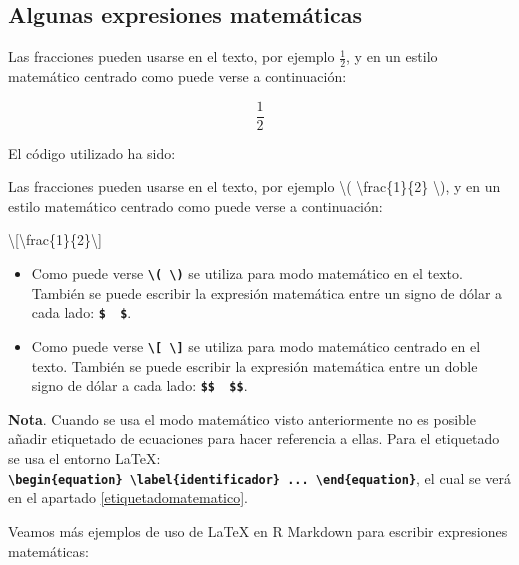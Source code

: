 \documentclass[12pt,a4paper,]{book}
\newenvironment{Shaded}{\begin{snugshade}}{\end{snugshade}}
\newcommand{\NormalTok}[1]{#1}
\newcommand{\SpecialCharTok}[1]{\textcolor[rgb]{0.00,0.00,0.00}{#1}}
\numberwithin{dummy}{section}
\theoremstyle{ocrenumbox}
\theoremstyle{blacknumex}
\theoremstyle{blacknumbox}
\theoremstyle{ocrenum}
\theoremstyle{ocrenum}
\begin{document}
\hypertarget{algunas-expresiones-matemuxe1ticas}{%
\subsection{Algunas expresiones
matemáticas}\label{algunas-expresiones-matemuxe1ticas}}

Las fracciones pueden usarse en el texto, por ejemplo \(\frac{1}{2}\), y
en un estilo matemático centrado como puede verse a continuación:

\[\frac{1}{2}\]

El código utilizado ha sido:

\begin{Shaded}
\begin{Highlighting}[]
\NormalTok{Las fracciones pueden usarse en el texto, por ejemplo }\SpecialCharTok{\textbackslash{}(}\NormalTok{ \textbackslash{}frac\{1\}\{2\} }\SpecialCharTok{\textbackslash{})}\NormalTok{, }
\NormalTok{y en un estilo matemático centrado como puede verse a continuación:}
 
\SpecialCharTok{\textbackslash{}[}\NormalTok{\textbackslash{}frac\{1\}\{2\}}\SpecialCharTok{\textbackslash{}]}
\end{Highlighting}
\end{Shaded}

\begin{itemize}
\item
  Como puede verse
  \textbf{\texttt{\textbackslash{}(\ \textbackslash{})}} se utiliza para
  modo matemático en el texto. También se puede escribir la expresión
  matemática entre un signo de dólar a cada lado:
  \textbf{\texttt{\$\ \ \$}}.
\item
  Como puede verse
  \textbf{\texttt{\textbackslash{}{[}\ \textbackslash{}{]}}} se utiliza
  para modo matemático centrado en el texto. También se puede escribir
  la expresión matemática entre un doble signo de dólar a cada lado:
  \textbf{\texttt{\$\$\ \ \$\$}}.
\end{itemize}

\textbf{Nota}. Cuando se usa el modo matemático visto anteriormente no
es posible añadir etiquetado de ecuaciones para hacer referencia a
ellas. Para el etiquetado se usa el entorno LaTeX:
\textbf{\texttt{\textbackslash{}begin\{equation\}\ \textbackslash{}label\{identificador\}\ ...\ \textbackslash{}end\{equation\}}},
el cual se verá en el apartado \ref{etiquetadomatematico}.

Veamos más ejemplos de uso de LaTeX en R Markdown para escribir
expresiones matemáticas:
\end{document}
